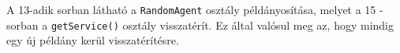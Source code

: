 \pagebreak


A 13-adik sorban látható a \texttt{RandomAgent} osztály példányosítása, melyet a 15 -sorban a \texttt{getService()} osztály visszatérít. Ez által valósul meg az, hogy mindig egy új példány kerül visszatérítésre.